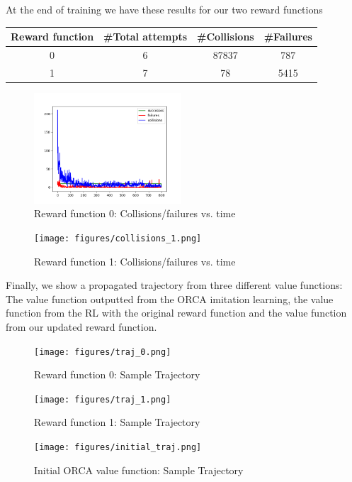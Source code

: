 \documentclass[conference]{IEEEtran}
\begin{document}
At the end of training we have these results for our two reward functions 
\begin{center}
\begin{tabular}{||c c c c||} 
 \hline
 Reward function & \#Total attempts & \#Collisions  & \#Failures \\ [0.5ex] 
 \hline\hline
 0 & 6 & 87837 & 787 \\ 
 \hline
 1 & 7 & 78 & 5415 \\
 \hline
\end{tabular}
\end{center}
\begin{figure}
    \centering
    \includegraphics[width=0.49\textwidth]{docs/latex/figures/statistics_rew0.png}
    \caption{Reward function 0: Collisions/failures vs. time}
    \label{fig:rew_0_coll}
\end{figure}
\begin{figure}
    \centering
    \texttt{[image: figures/collisions\_1.png]}
    \caption{Reward function 1: Collisions/failures vs. time}
    \label{fig:rew_1_coll}
\end{figure}

Finally, we show a propagated trajectory from three different value functions: The value function outputted from the ORCA imitation learning, the value function from the RL with the original reward function and the value function from our updated reward function. 

\begin{figure}
    \centering
    \texttt{[image: figures/traj\_0.png]}
    \caption{Reward function 0: Sample Trajectory}
    \label{fig:rew_0_traj}
\end{figure}
\begin{figure}
    \centering
    \texttt{[image: figures/traj\_1.png]}
    \caption{Reward function 1: Sample Trajectory}
    \label{fig:rew_1_traj}
\end{figure}
\begin{figure}
    \centering
    \texttt{[image: figures/initial\_traj.png]}
    \caption{Initial ORCA value function: Sample Trajectory}
    \label{fig:initial_traj}
\end{figure}
\end{document}
